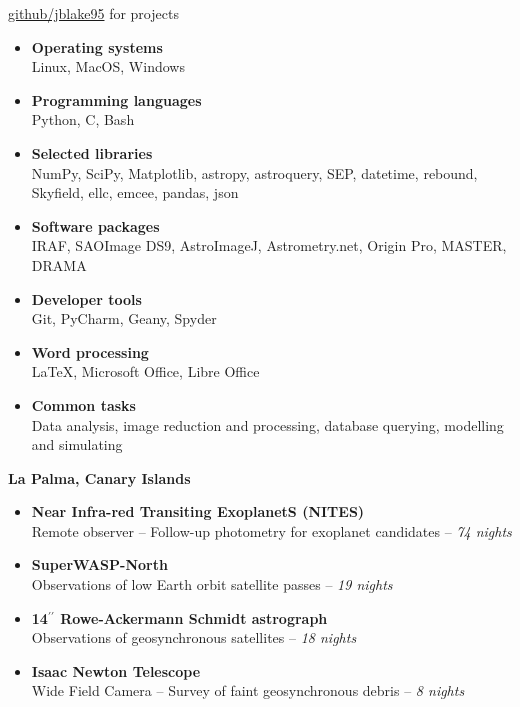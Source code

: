 
\small \faGithub \hspace{2pt} \href{https://github.com/jblake95}{github/jblake95} for projects
\smallskip
\begin{itemize}
	\item \textbf{Operating systems} \\
	Linux, MacOS, Windows
	\item \textbf{Programming languages} \\
	Python, C, Bash
	\item \textbf{Selected libraries} \\
	NumPy, SciPy, Matplotlib, astropy, astroquery, SEP, datetime, rebound, Skyfield, ellc, emcee, pandas, json
	\item \textbf{Software packages} \\
	IRAF, SAOImage DS9, AstroImageJ, Astrometry.net, Origin Pro, MASTER, DRAMA
	\item \textbf{Developer tools} \\
	Git, PyCharm, Geany, Spyder
	\item \textbf{Word processing} \\
	\LaTeX, Microsoft Office, Libre Office
	\item \textbf{Common tasks} \\
	Data analysis, image reduction and processing, database querying, modelling and simulating
\end{itemize}

\medskip


\normalsize \textbf{La Palma, Canary Islands}

\medskip

\begin{itemize}
	\item \small \textbf{Near Infra-red Transiting ExoplanetS (NITES)} \\
	Remote observer -- Follow-up photometry for exoplanet candidates -- \textit{74 nights}
	\item \small \textbf{SuperWASP-North} \\ Observations of low Earth orbit satellite passes -- \textit{19 nights}
	\item \small \textbf{14$^{\prime\prime}$ Rowe-Ackermann Schmidt astrograph} \\
	Observations of geosynchronous satellites -- \textit{18 nights}
	\item \small \textbf{Isaac Newton Telescope} \\
	Wide Field Camera -- Survey of faint geosynchronous debris -- \textit{8 nights} 
\end{itemize}

